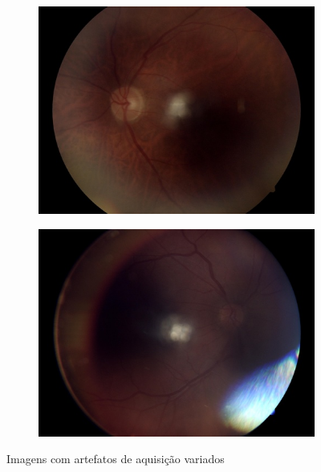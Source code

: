 \documentclass[12pt]{article}
\begin{document}
\begin{figure}
\begin{subfigure}[b]{0.2\textwidth}
        \label{fig:images_variations_2_2}
    \end{subfigure}
    \hfill
    \begin{subfigure}[b]{0.2\textwidth}
        \centering
        \includegraphics[width=\textwidth]{images/examples_from_dataset/TRAIN049428.JPG}
        \label{fig:images_variations_2_3}
    \end{subfigure}
    \hfill
    \begin{subfigure}[b]{0.2\textwidth}
        \centering
        \includegraphics[width=\textwidth]{images/examples_from_dataset/TRAIN065536.JPG}
        \label{fig:images_variations_2_4}
    \end{subfigure}
    \caption{Imagens com artefatos de aquisição variados}
    \label{fig:images_variations_2}
\end{figure}
\end{document}
